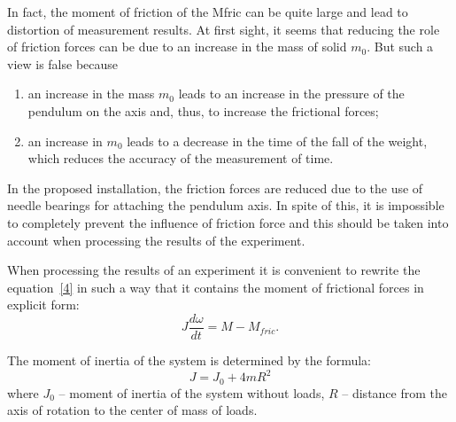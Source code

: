\documentclass{LabWorkEng}
\begin{document}
In fact, the moment of friction of the Mfric can be quite large and lead to distortion of measurement results. At first sight, it seems that reducing the role of friction forces can be due to an increase in the mass of solid $m_0$. But such a view is false because
\begin{enumerate}
	\item an increase in the mass $m_0$  leads to an increase in the pressure of the pendulum on the axis and, thus, to increase the frictional forces;
	\item an increase in $m_0$ leads to a decrease in the time of the fall of the weight, which reduces the accuracy of the measurement of time.
\end{enumerate}


In the proposed installation, the friction forces are reduced due to the use of needle bearings for attaching the pendulum axis. In spite of this, it is impossible to completely prevent the influence of friction force and this should be taken into account when processing the results of the experiment.

When processing the results of an experiment it is convenient to rewrite the equation~\eqref{4} in such a way that it contains the moment of frictional forces in explicit form:
\begin{equation}\label{4'}
	J\frac{d\omega}{dt} = M - {M_{fric}}.
\end{equation}

The moment of inertia of the system is determined by the formula:
\begin{equation}\label{9}
	J = {J_0} + 4m{R^2}
\end{equation}
where $J_0$ -- moment of inertia of the system without loads, $R$ -- distance from the axis of rotation to the center of mass of loads.
\end{document}
